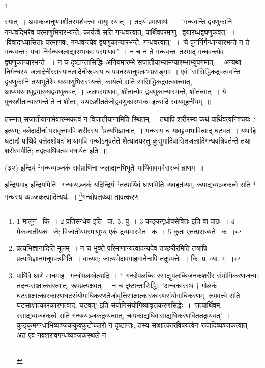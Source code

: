 \documentclass[11pt, openany]{book}
\newcommand\blfootnote[1]{%
 \begingroup
 \renewcommand\thefootnote{}\footnote{#1}%
 \addtocounter{footnote}{-1}%
 \endgroup
}
\begin{document}
\blfootnote{1 मालूनं \textendash\ कि~। 2 प्रतिसन्धेय इति \textendash\ पा. ३. पु~। 3 कङ्कगृध्रोपसेवितः इति वा पाठः~। 4 मेकजातीयक$^\circ$\textendash\ जे; विजातीयपरमाणुभ्य एकं द्रव्यमारभेत  \textendash\ क~। 5 कुतः एतत्प्रसज्यते  \textendash\ क~।}

\newpage
\noindent
स्यात्~। अपाकजानुष्णाशीतस्पर्शवत्त्वा वायुः स्यात्~। तदयं प्रमाणार्थः ~। 'गन्धवन्ति द्व्यणुकानि गन्धवद्भिरेव परमाणुभिरारभ्यन्ते, कार्यत्वे सति गन्धवत्त्वात्, पार्थिवपरमाणु \textendash\ द्वयारब्धद्व्यणुकवत्'~। 'विवादाध्यासिताः परमाणवः, गन्धवन्त्येव द्व्यणुकान्यारभन्ते, गन्धवत्त्वात्'~। 'ये पुनर्निर्गन्धान्यारभन्ते न ते गन्धवन्तः; यधा निर्गन्धजलाद्यारम्भकाः परमाणवः'~। न च न ते गन्धवन्तः तस्माद् गन्धवन्त्येव द्व्यणुकान्यारभन्ते ~। न च दृष्टान्तासिद्धिः अनियमारम्भे सजातीयाभ्यामप्यारम्भाभ्युपगमात्~। अन्यथा निर्गन्धस्य जलादेनीरसस्यानलादेनीरूपस्य च पवनस्यानुपलम्भप्रसङ्गाः~। एवं 'सांसिद्धिकद्रवत्ववन्ति द्व्यणुकानि तथाभूतैरेव परमाणुभिरारभ्यन्ते, कार्यत्वे सति सांसिद्धिकद्रवत्ववत्त्वात्, आप्यपरमाणुद्वयारब्धद्व्यणुकवत्~। जलपरमाणवः, शीतान्येव द्व्यणुकान्यारभन्ते, शीतत्वात्~। ये पुनरशीतान्यारभन्ते ते न शीताः, यथाऽशीततेजोद्व्यणुकारम्भका इत्यादि स्वयमूहनीयम्~॥

तस्मात् सजातीयानामेवारम्भकत्वं न विजातीयानामिति स्थितम्~। तथापि शरीरस्य कथं पार्थिवत्वनिश्चयः ? इत्थम्; क्लेदादीनां परावृत्तावपि शरीरस्य \renewcommand{\thefootnote}{१}\footnote{प्रत्यभिज्ञानादिति मूलम्~। न च भुक्ते परिमाणान्यत्वादन्यदेव तच्छरीरमिति तत्रापि प्रत्यभिज्ञानमनुपपन्नमिति~। वाच्यम्; जात्यभेदावगाहमानेनापि तदुपपत्तेः~। कि. प्र. व्या. भ~।}प्रत्यभिज्ञानात्~। गन्धस्य च यावद्द्रव्यभावित्वाद् घटवत्~। यथाहि घटादौ पार्थिवे क्लेदशोषद$^1$शायामपि गन्धोऽनुवर्तते शैत्यादयस्तु कुसुमादिवासितजलादिगन्धवन्निवर्तन्ते तथा शरीरमपीति; तद्वत्पार्थिवत्वमवधार्यत इति~॥

\hangindent=2cm {\knu (३२) इन्द्रियं ${}^2$गन्धव्यञ्जकं सर्वप्राणिनां जलाद्यनभिभूतैः पार्थिवावयवैरारब्धं घ्राणम्~॥}

इन्द्रियमाह {\knu इन्द्रियमि}ति \textendash\ गन्धव्यञ्जकं यदिन्द्रियं ${}^3$तत्पार्थिवं घ्राणमिति व्यवहर्तव्यम्, रूपाद्यव्यञ्जकत्वे सति ${}^4$गन्धस्य व्यञ्जकत्वादित्यर्थः~। \renewcommand{\thefootnote}{२}\footnote{पार्थिवे घ्राणे मानमाह \textendash\ गन्धोपलब्धेत्यादि~। * गन्धोपलब्धिः रसाद्युपलब्धिजनकशरीर संयोगिकरणजन्या, तदन्यसाक्षात्कारत्वात्, रूपप्रत्यक्षवत्~। न च दृष्टान्तासिद्धिः, 'अन्धकारस्थं $\dagger$ गोलकं घटसाक्षात्कारकारणघटसंयोगाधिकरणतेजोवृत्तिसाक्षात्कारकारणसंयोगाधिकरणम्, रूपवत्त्वे सति $\ddagger$ घटसाक्षात्कारकारणत्वाद्, घटवत्' इति संयोगिसंयोगिव्यावृत्तकरणसिद्धेः~। 'तत्पार्थिवम्, रसाद्यव्यज्जकत्वे सति गन्धव्यञ्जकद्रव्यत्वात्, चम्पकाद्यधिवासाद्यधिकरणविततद्रव्यवत्'~। कुङ्कुमगन्धाभिव्यञ्जककुक्कुटोच्चारो न दृष्टान्तः, तस्य साक्षात्कारविषयत्वेन रूपादिव्यञ्जकत्वात्~। अत एव नवशरावगन्धव्यञ्जकस्थले न\\ \rule{0.4\linewidth}{0.5pt}}गन्धोपलब्ध्या तावत्करण
\end{document}
